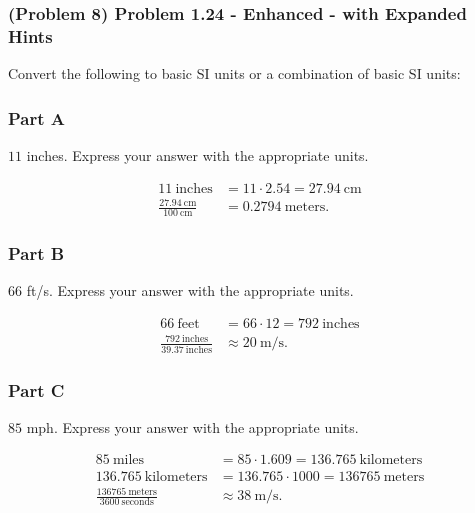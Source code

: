 \newpage

\subsubsection{(Problem 8) Problem 1.24 - Enhanced - with Expanded Hints}

Convert the following to basic SI units or a combination of basic SI units:

\subsubsection{Part A}

$11$ inches. Express your answer with the appropriate units.

\begin{solution}
	\begin{align*}
		11~\text{inches} &= 11 \cdot 2.54 = 27.94~\text{cm} \\
		\frac{27.94~\text{cm}}{100~\text{cm}} &= 0.2794~\text{meters}
		.\end{align*}
\end{solution}

\subsubsection{Part B}

$66$ ft/s. Express your answer with the appropriate units.

\vspace{1em}

\begin{solution}
	\begin{align*}
		66~\text{feet} &= 66 \cdot 12 = 792~\text{inches} \\
		\frac{792~\text{inches}}{39.37~\text{inches}} &\approx 20~\text{m/s}
		.\end{align*}
\end{solution}

\subsubsection{Part C}

$85$ mph. Express your answer with the appropriate units.

\vspace{1em}

\begin{solution}
	\begin{align*}
		85~\text{miles} &= 85 \cdot 1.609 = 136.765~\text{kilometers} \\
		136.765~\text{kilometers} &= 136.765 \cdot 1000 = 136765~\text{meters} \\
		\frac{136765~\text{meters}}{3600~\text{seconds}} &\approx 38~\text{m/s}
		.\end{align*}
\end{solution}


